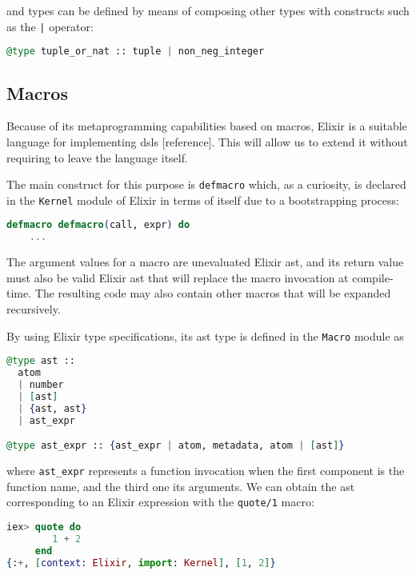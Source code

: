 and types can be defined by means of composing other types with constructs such
as the \verb+|+ operator:

\begin{lstlisting}[language=elixir,numbers=none,frame=none]
@type tuple_or_nat :: tuple | non_neg_integer
\end{lstlisting}

\subsection{Macros}

Because of its metaprogramming capabilities based on macros, Elixir is a suitable
language for implementing \gls{dsl}s [reference]. This will allow us to extend 
it without requiring to leave the language itself.

The main construct for this purpose is \verb|defmacro| which, as a curiosity,
is declared in the \verb|Kernel| module of Elixir in terms of itself due to 
a bootstrapping process:

\begin{lstlisting}[language=elixir,numbers=none,frame=none]
  defmacro defmacro(call, expr) do
    ...
\end{lstlisting}

The argument values for a macro are unevaluated Elixir \gls{ast}, and its return 
value must also be valid Elixir \gls{ast} that will replace the macro invocation 
at compile-time. The resulting code may also contain other macros that will be
expanded recursively.

By using Elixir type specifications, its \gls{ast} type is defined in the 
\verb|Macro| module as

\begin{lstlisting}[language=elixir,numbers=none,frame=none]
@type ast ::
  atom
  | number
  | [ast]
  | {ast, ast}
  | ast_expr

@type ast_expr :: {ast_expr | atom, metadata, atom | [ast]}
\end{lstlisting}

where \verb|ast_expr| represents a function invocation when the first component
is the function name, and the third one its arguments. We can obtain the \gls{ast}
corresponding to an Elixir expression with the \verb|quote/1| macro:

\begin{lstlisting}[language=elixir,numbers=none,frame=none]
iex> quote do 
        1 + 2
     end
{:+, [context: Elixir, import: Kernel], [1, 2]}
\end{lstlisting}

